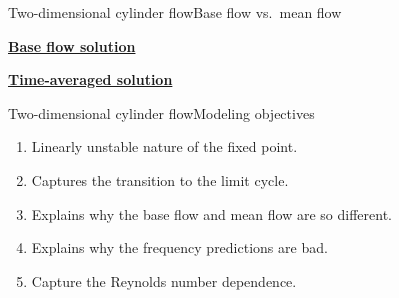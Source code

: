 \documentclass[usenames,dvipsnames,svgnames,10pt,aspectratio=169]{beamer}
\begin{document}
\begin{frame}[t, c]{Two-dimensional cylinder flow}{Base flow vs.\ mean flow}
  \begin{minipage}{.48\textwidth}
    \centering
    \underline{\textbf{Base flow solution}}
  \end{minipage}%
  \hfill
  \begin{minipage}{.48\textwidth}
    \centering
    \underline{\textbf{Time-averaged solution}}
  \end{minipage}
\end{frame}





\begin{frame}[t, c]{Two-dimensional cylinder flow}{Modeling objectives}
  \begin{minipage}{.68\textwidth}
    \centering
    
    \bigskip

    \begin{enumerate}
    \item Linearly unstable nature of the fixed point.
    \item Captures the transition to the limit cycle.
    \item Explains why the base flow and mean flow are so different.
    \item Explains why the frequency predictions are bad.
    \item Capture the Reynolds number dependence.
    \end{enumerate}


\end{minipage}
\end{frame}
\end{document}
